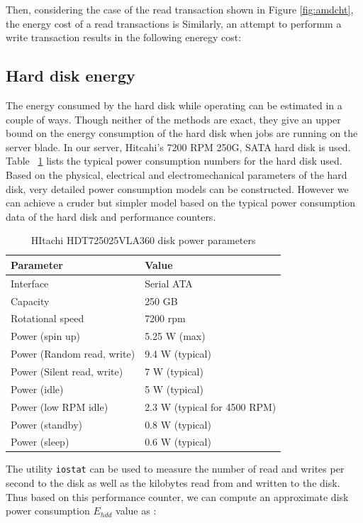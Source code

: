 \documentclass[times, 10pt,onecolumn]{article}
\begin{document}
Then, considering the case of the read transaction shown in Figure
\ref{fig:amdcht}, the energy cost of a read transactions is
Similarly, an attempt to performm a write transaction results in the
following eneregy cost:


\subsection{Hard disk energy}
\label{sec:networkengery}
The energy consumed by the hard disk while operating can be estimated in
a couple of ways. Though neither of the methods are exact, they give an
upper bound on the energy consumption of the hard disk when jobs are
running on the server blade. In our server, Hitcahi's 7200 RPM 250G,
SATA hard disk is used. Table ~\ref{tab:hddparam} lists the typical
power consumption numbers for the hard disk used. Based on the physical,
electrical and electromechanical parameters of the hard disk, very
detailed power consumption models can be constructed. However we can
achieve a cruder but simpler model based on the typical power
consumption data of the hard disk and performance counters.

\begin{table}[h!t!]
\caption{HItachi HDT725025VLA360 disk power parameters}
\begin{tabular}{ l l }
\hline 
\hline
Parameter & Value \\
\hline
  Interface & Serial ATA  \\
  Capacity & 250 GB  \\
  Rotational speed & 7200 rpm  \\
  Power (spin up) & 5.25 W (max)  \\
  Power (Random read, write) & 9.4 W (typical)  \\
  Power (Silent read, write) & 7 W (typical)  \\
  Power (idle) & 5 W (typical)  \\
  Power (low RPM idle) & 2.3 W (typical for 4500 RPM)  \\
  Power (standby) & 0.8 W (typical)  \\
  Power (sleep) & 0.6 W (typical)  \\
\hline \hline
\end{tabular}
\label{tab:hddparam}
\end{table}

The utility \texttt{iostat} can be used to measure the number of read
and writes per second to the disk as well as the kilobytes read from and
written to the disk. Thus based on this performance counter, we can
compute an approximate disk power consumption $E_{hdd}$ value as :
\end{document}
